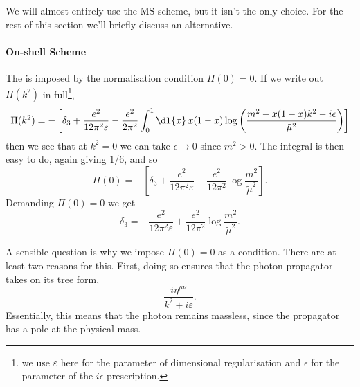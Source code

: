 \documentclass[fleqn]{NotesClass}
\newcommand{\MSbar}{\ensuremath{\overline{\text{MS}}}}
\newcommand{\minkowskiMetric}{\eta}
\begin{document}
    We will almost entirely use the \MSbar{} scheme, but it isn't the only choice.
    For the rest of this section we'll briefly discuss an alternative.
    
    \paragraph{On-shell Scheme}
    The  is imposed by the normalisation condition \(\Pi(0) = 0\).
    If we write out \(\Pi(k^2)\) in full\footnote{we use \(\varepsilon\) here for the parameter of dimensional regularisation and \(\epsilon\) for the parameter of the \(i\epsilon\) prescription.},
    \begin{equation}
        \Pi(k^2) = -\left[ \delta_3 + \frac{e^2}{12\pi^2\varepsilon} - \frac{e^2}{2\pi^2} \int_0^1 \dl{x} \, x(1 - x) \log\left( \frac{m^2 - x(1 - x)k^2 - i\epsilon}{\tilde{\mu}^2} \right) \right]
    \end{equation}
    then we see that at \(k^2 = 0\) we can take \(\epsilon \to 0\) since \(m^2 > 0\).
    The integral is then easy to do, again giving \(1/6\), and so
    \begin{equation}
        \Pi(0) = -\left[ \delta_3 + \frac{e^2}{12\pi^2\varepsilon} - \frac{e^2}{12\pi^2} \log \frac{m^2}{\tilde{\mu}^2} \right].
    \end{equation}
    Demanding \(\Pi(0) = 0\) we get
    \begin{equation}
        \delta_3 = -\frac{e^2}{12\pi^2\varepsilon} + \frac{e^2}{12\pi^2} \log \frac{m^2}{\tilde{\mu}^2}.
    \end{equation}
    
    A sensible question is why we impose \(\Pi(0) = 0\) as a condition.
    There are at least two reasons for this.
    First, doing so ensures that the photon propagator takes on its tree form,
    \begin{equation}
        \frac{i\minkowskiMetric^{\mu\nu}}{k^2 + i\varepsilon}.
    \end{equation}
    Essentially, this means that the photon remains massless, since the propagator has a pole at the physical mass.
    
\end{document}

